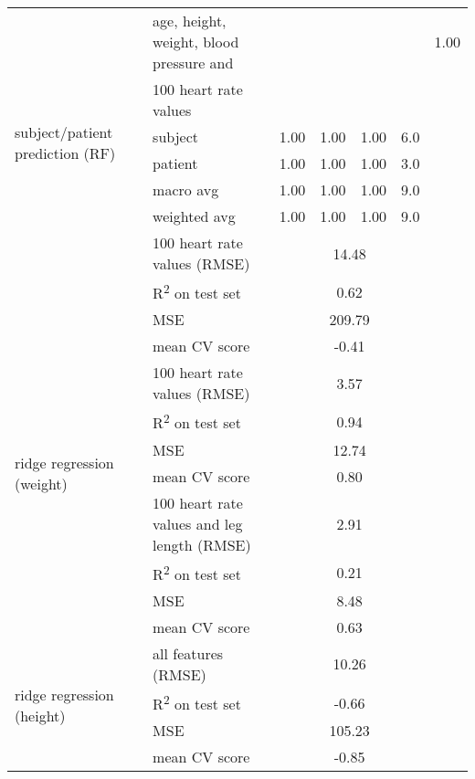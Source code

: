 \begin{longtable}{llrrrrr}
    \midrule
    \multirow{7}{*}{subject/patient prediction (RF)} 
    & age, height, weight, blood pressure and & & & & & 1.00 \\
    & 100 heart rate values & & & & &  \\
    & subject & 1.00 & 1.00 & 1.00 & 6.0 & \\
    & patient & 1.00 & 1.00 & 1.00 & 3.0 & \\
    & macro avg & 1.00 & 1.00 & 1.00 & 9.0 & \\
    & weighted avg & 1.00 & 1.00 & 1.00 & 9.0 & \\
    \midrule
    \multirow{6}{*}{ridge regression (age)} 
    & 100 heart rate values (RMSE) & \multicolumn{4}{c}{14.48} & \\
    & R\textsuperscript{2} on test set & \multicolumn{4}{c}{0.62} & \\
    & MSE & \multicolumn{4}{c}{209.79} & \\
    & mean CV score & \multicolumn{4}{c}{-0.41} & \\
    \midrule
    \multirow{6}{*}{ridge regression (weight)} 
    & 100 heart rate values (RMSE) & \multicolumn{4}{c}{3.57} & \\
    & R\textsuperscript{2} on test set & \multicolumn{4}{c}{0.94} & \\
    & MSE & \multicolumn{4}{c}{12.74} & \\
    & mean CV score & \multicolumn{4}{c}{0.80} & \\
    \midrule
    \multirow{6}{*}{ridge regression (BMI)} 
    & 100 heart rate values and leg length (RMSE) & \multicolumn{4}{c}{2.91} & \\
    & R\textsuperscript{2} on test set & \multicolumn{4}{c}{0.21} & \\
    & MSE & \multicolumn{4}{c}{8.48} & \\
    & mean CV score & \multicolumn{4}{c}{0.63} & \\
    \midrule
    \multirow{6}{*}{ridge regression (height)} 
    & all features (RMSE) & \multicolumn{4}{c}{10.26} & \\
    & R\textsuperscript{2} on test set & \multicolumn{4}{c}{-0.66} & \\
    & MSE & \multicolumn{4}{c}{105.23} & \\
    & mean CV score & \multicolumn{4}{c}{-0.85} & \\
    \bottomrule
\end{longtable}

